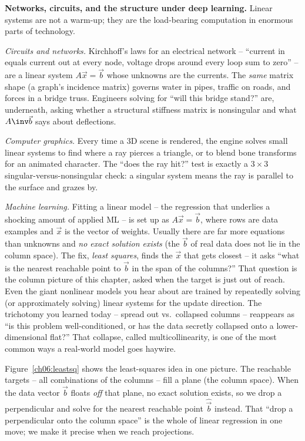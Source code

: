 \begin{applicationbox}
\textbf{Networks, circuits, and the structure under deep learning.}
Linear systems are not a warm-up; they are the load-bearing computation in
enormous parts of technology.

\emph{Circuits and networks.} Kirchhoff's laws for an electrical network --
``current in equals current out at every node, voltage drops around every
loop sum to zero'' -- are a linear system $A\vec x=\vec b$ whose unknowns are
the currents. The \emph{same} matrix shape (a graph's incidence matrix)
governs water in pipes, traffic on roads, and forces in a bridge truss.
Engineers solving for ``will this bridge stand?'' are, underneath, asking
whether a structural stiffness matrix is nonsingular and what $A\inv\vec b$
says about deflections.

\emph{Computer graphics.} Every time a 3D scene is rendered, the engine
solves small linear systems to find where a ray pierces a triangle, or to
blend bone transforms for an animated character. The ``does the ray hit?''
test is exactly a $3\times3$ singular-versus-nonsingular check: a singular
system means the ray is parallel to the surface and grazes by.

\emph{Machine learning.} Fitting a linear model -- the regression that
underlies a shocking amount of applied ML -- is set up as $A\vec x=\vec b$,
where rows are data examples and $\vec x$ is the vector of weights. Usually
there are far more equations than unknowns and \emph{no exact solution
exists} (the $\vec b$ of real data does not lie in the column space). The
fix, \emph{least squares}, finds the $\vec x$ that gets closest -- it asks
``what is the nearest reachable point to $\vec b$ in the span of the
columns?'' That question is the column picture of this chapter, asked when
the target is just out of reach. Even the giant nonlinear models you hear
about are trained by repeatedly solving (or approximately solving) linear
systems for the update direction. The trichotomy you learned today -- spread
out vs.\ collapsed columns -- reappears as ``is this problem
well-conditioned, or has the data secretly collapsed onto a lower-dimensional
flat?'' That collapse, called multicollinearity, is one of the most common
ways a real-world model goes haywire.
\end{applicationbox}

Figure~\ref{ch06:leastsq} shows the least-squares idea in one picture. The
reachable targets -- all combinations of the columns -- fill a plane (the
column space). When the data vector $\vec b$ floats \emph{off} that plane, no
exact solution exists, so we drop a perpendicular and solve for the nearest
reachable point $\hat{\vec b}$ instead. That ``drop a perpendicular onto the
column space'' is the whole of linear regression in one move; we make it
precise when we reach projections.

